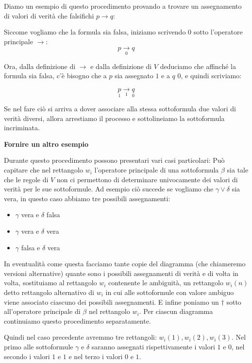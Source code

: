 \documentclass[a4paper, titlepage, 12pt]{report}
\begin{document}
Diamo un esempio di questo procedimento provando a trovare un assegnamento
di valori di verità che falsifichi $p \rightarrow q$:

Siccome vogliamo che la formula sia falsa, iniziamo scrivendo $0$ sotto l'operatore principale $\rightarrow$:
$$p \underset{0}{\rightarrow} q$$

Ora, dalla definizione di $\rightarrow$ e dalla definizione di $V$
deduciamo che affinché la formula sia falsa, c'è bisogno
che a $p$ sia assegnato $1$ e a $q$ $0$, e quindi scriviamo:

$$\underset{1}{p} \underset{1}{\rightarrow} \underset{0}{q}$$

Se nel fare ciò si arriva a dover associare alla stessa sottoformula
due valori di verità diversi, allora arrestiamo il processo e sottolineiamo
la sottoformula incriminata.

\textbf{Fornire un altro esempio}

Durante questo procedimento possono presentari vari casi particolari:
Può capitare che nel rettangolo $w_i$ l'operatore principale di una sottoformula $\beta$ sia tale che le regole di $V$
non ci permettono di determinare univocamente dei valori di verità per le sue sottoformule.
Ad esempio ciò succede se vogliamo che $\gamma \lor \delta$ sia vera, in questo caso abbiamo tre possibili
assegnamenti:
\begin{itemize}
    \item $\gamma$ vera  e $\delta$ falsa
    \item $\gamma$ vera  e $\delta$ vera
    \item $\gamma$ falsa e $\delta$ vera
\end{itemize}

In eventualità come questa facciamo tante copie del diagramma (che chiameremo versioni alternative)
quante sono i possibili assegnamenti di verità e di volta in volta, sostituiamo al rettangolo $w_i$ contenente le ambiguità,
un rettangolo $w_i(n)$ detto rettangolo alternativo di $w_i$ in cui alle sottoformule
con valore ambiguo viene associato ciascuno dei possibili assegnamenti.
E infine poniamo un $\dagger$ sotto all'operatore principale di $\beta$ nel rettangolo $w_i$.
Per ciascun diagramma continuiamo questo procedimento separatamente.

Quindi nel caso precedente avremmo tre rettangoli: $w_i(1), w_i(2), w_i(3)$.
Nel primo alle sottoformule $\gamma$ e $\delta$ saranno assegnati rispettivamente i valori $1$ e $0$,
nel secondo i valori $1$ e $1$ e nel terzo i valori $0$ e $1$.
\end{document}
